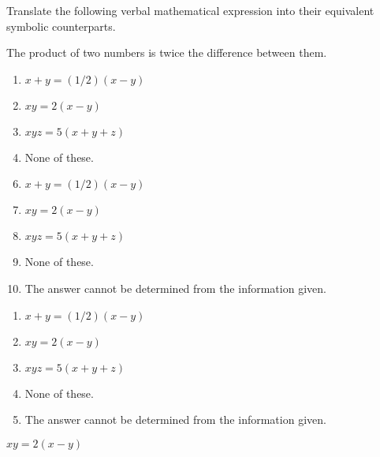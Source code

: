  Translate the following verbal mathematical expression into their equivalent symbolic counterparts.

 The product of two numbers is twice the difference between them.




\ifsat
	\begin{enumerate}[label=\Alph*)]
		\item $x+y=(1/2)(x-y)$
		\item $xy=2(x-y)$%
		\item $xyz=5(x+y+z)$
		\item None of these.
	\end{enumerate}
\else
\fi

\ifacteven
	\begin{enumerate}[label=\textbf{\Alph*.},itemsep=\fill,align=left]
		\setcounter{enumii}{5}
		\item $x+y=(1/2)(x-y)$
		\item $xy=2(x-y)$%
		\item $xyz=5(x+y+z)$
		\addtocounter{enumii}{1}
		\item None of these.
		\item The answer cannot be determined from the information given.
	\end{enumerate}
\else
\fi

\ifactodd
	\begin{enumerate}[label=\textbf{\Alph*.},itemsep=\fill,align=left]
		\item $x+y=(1/2)(x-y)$
		\item $xy=2(x-y)$%
		\item $xyz=5(x+y+z)$
		\item None of these.
		\item The answer cannot be determined from the information given.
	\end{enumerate}
\else
\fi

\ifgridin
 $xy=2(x-y)$%
		
\else
\fi

